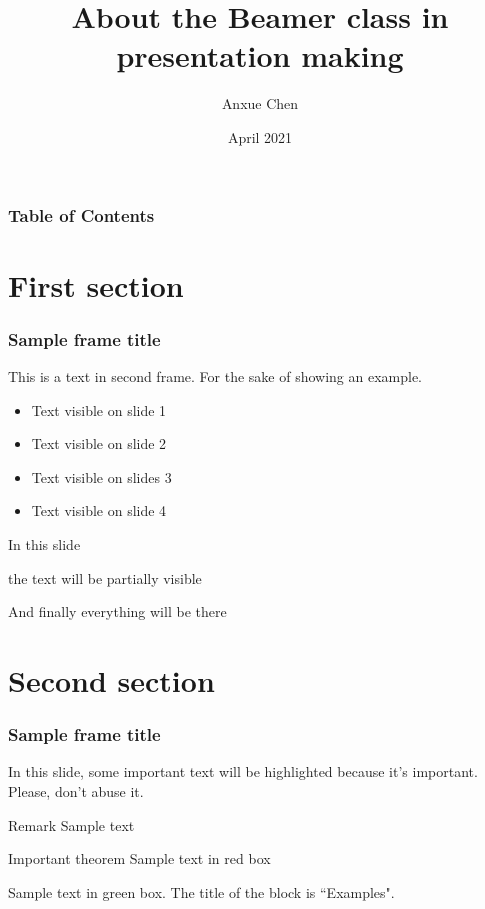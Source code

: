 \documentclass{beamer}
\title[About Beamer] %
{\textbf{About the Beamer class in presentation making}}
\author[Anxue Chen]
{Anxue Chen}
\institute[SJTU]{Shanghai Jiao Tong University}
\date{April 2021}
\begin{document}
\frame{\titlepage}


\begin{frame}
	\frametitle{Table of Contents}
	\tableofcontents
\end{frame}


\section{First section}

\begin{frame}
	\frametitle{Sample frame title}
	This is a text in second frame. For the sake of showing an example.

	\begin{itemize}
		\item<1-> Text visible on slide 1
		\item<2-> Text visible on slide 2
		\item<3> Text visible on slides 3
		\item<4-> Text visible on slide 4
	\end{itemize}
\end{frame}



\begin{frame}
	In this slide \pause

	the text will be partially visible \pause

	And finally everything will be there
\end{frame}

\section{Second section}

\begin{frame}
	\frametitle{Sample frame title}

	In this slide, some important text will be
	\alert{highlighted} because it's important.
	Please, don't abuse it.

	\begin{block}{Remark}
		Sample text
	\end{block}

	\begin{alertblock}{Important theorem}
		Sample text in red box
	\end{alertblock}

	\begin{examples}
		Sample text in green box. The title of the block is ``Examples".
	\end{examples}
\end{frame}
\end{document}
